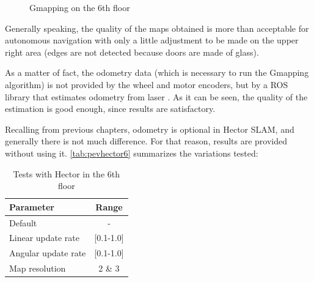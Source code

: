 \begin{figure}[htb]
  \caption{Gmapping on the 6th floor}
  \label{fig:pevgm6var}
\end{figure}

Generally speaking, the quality of the maps obtained is more than acceptable for autonomous navigation with only a little adjustment to be made on the upper right area (edges are not detected because doors are made of glass).

As a matter of fact, the odometry data (which is necessary to run the Gmapping algorithm) is not provided by the wheel and motor encoders, but by a ROS library that estimates odometry from laser . As it can be seen, the quality of the estimation is good enough, since results are satisfactory.

 Recalling from previous chapters, odometry is optional in Hector SLAM, and generally there is not much difference. For that reason, results are provided without using it. \autoref{tab:pevhector6} summarizes the variations tested:
\begin{table}[h!]
  \centering
  \begin{tabular}{lc}
  \hline
  \textbf{Parameter} & \textbf{Range} \\ \hline
  Default & - \\ \hline
  Linear update rate & {[}0.1-1.0{]} \\ \hline
  Angular update rate & {[}0.1-1.0{]} \\ \hline
  Map resolution & 2 \& 3 \\ \hline
  \end{tabular}
  \caption{Tests with Hector in the 6th floor}
  \label{tab:pevhector6}
\end{table}

